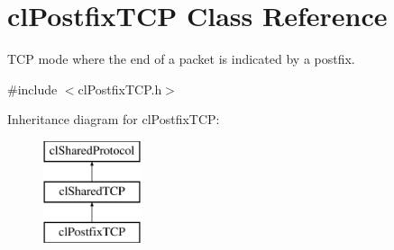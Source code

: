 \hypertarget{classcl_postfix_t_c_p}{
\section{clPostfixTCP Class Reference}
\label{classcl_postfix_t_c_p}
}


TCP mode where the end of a packet is indicated by a postfix.  




{\ttfamily \#include $<$clPostfixTCP.h$>$}

Inheritance diagram for clPostfixTCP:\begin{figure}[H]
\begin{center}
\leavevmode
\includegraphics[height=3.000000cm]{classcl_postfix_t_c_p}
\end{center}
\end{figure}
